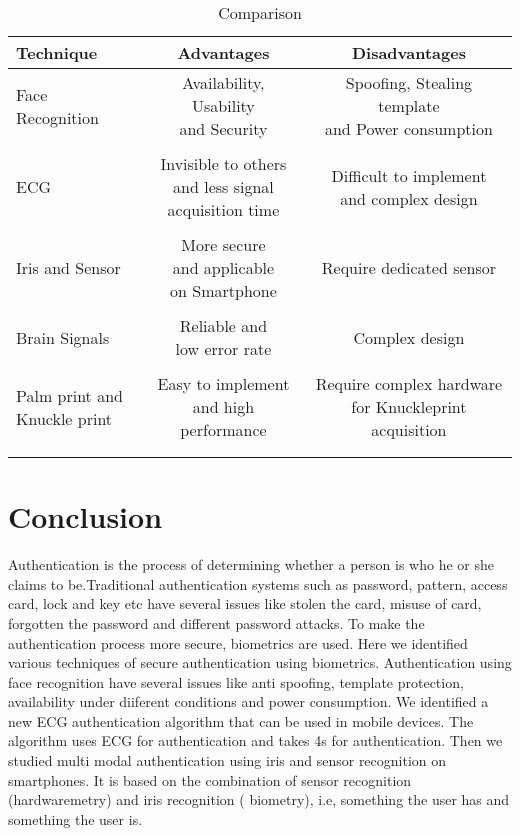 \documentclass[10pt,a4paper,journal]{IEEEtran}
\begin{document}
\begin{table}[ht]
\caption{Comparison}
\centering
\begin{tabular}{lcc}
\hline\hline
{Technique} & {Advantages} & {Disadvantages}\\[]
\hline
Face Recognition &\shortstack{Availability,\\Usability\\and Security} & \shortstack{Spoofing, Stealing template \\and Power consumption}\\\\
ECG & \shortstack{Invisible to others \\and less signal \\acquisition time} & \shortstack{Difficult to implement \\and complex design}\\\\
Iris and Sensor&\shortstack{More secure\\and applicable\\ on Smartphone} & Require dedicated sensor\\\\
Brain Signals & \shortstack{Reliable and \\low error rate} & Complex design\\\\
\shortstack{Palm print and\\Knuckle print} & \shortstack{Easy to implement \\and high performance }& \shortstack{Require complex hardware \\for Knuckleprint acquisition}\\\\
\hline\hline
\label{table 1}
\end{tabular}
\end{table}



 


\section{Conclusion}
\hspace{2em} Authentication is the process of determining whether a person is who he or she claims to be.Traditional authentication systems such as  password, pattern, access card, lock and key etc have several issues like stolen the card, misuse of card, forgotten the password and different password attacks. To make the authentication process more secure, biometrics are used. Here we identified various techniques of secure authentication using biometrics. Authentication using face recognition have several issues like anti spoofing, template protection, availability under diiferent conditions and power consumption. We identified a new ECG authentication algorithm that can be used in mobile devices. The algorithm uses ECG for authentication and takes 4s for authentication. Then we studied multi modal authentication using iris and sensor recognition on smartphones. It is based on the combination of sensor recognition (hardwaremetry) and iris recognition ( biometry), i.e, something the user has and something the user is. 
\end{document}
